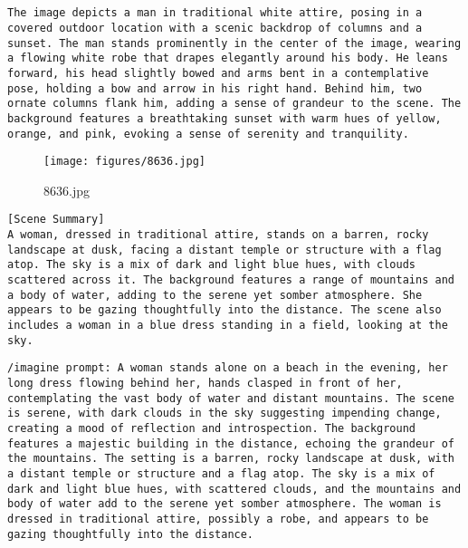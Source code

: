 \begin{lstlisting}[caption={Captions using Llama 3.2 with SAM 2 for 7386.jpg}]


The image depicts a man in traditional white attire, posing in a covered outdoor location with a scenic backdrop of columns and a sunset. The man stands prominently in the center of the image, wearing a flowing white robe that drapes elegantly around his body. He leans forward, his head slightly bowed and arms bent in a contemplative pose, holding a bow and arrow in his right hand. Behind him, two ornate columns flank him, adding a sense of grandeur to the scene. The background features a breathtaking sunset with warm hues of yellow, orange, and pink, evoking a sense of serenity and tranquility.
\end{lstlisting}

\clearpage
\begin{figure}[H]
    \centering
    \texttt{[image: figures/8636.jpg]}
    \caption{8636.jpg}
    \label{fig:8636.jpg}
\end{figure}



\begin{lstlisting}[caption={Captions using Ensemble without Llama for 8636.jpg}]
[Scene Summary]
A woman, dressed in traditional attire, stands on a barren, rocky landscape at dusk, facing a distant temple or structure with a flag atop. The sky is a mix of dark and light blue hues, with clouds scattered across it. The background features a range of mountains and a body of water, adding to the serene yet somber atmosphere. She appears to be gazing thoughtfully into the distance. The scene also includes a woman in a blue dress standing in a field, looking at the sky.
\end{lstlisting}


\begin{lstlisting}[caption={Captions using Ensemble with Llama for 8636.jpg}]
/imagine prompt: A woman stands alone on a beach in the evening, her long dress flowing behind her, hands clasped in front of her, contemplating the vast body of water and distant mountains. The scene is serene, with dark clouds in the sky suggesting impending change, creating a mood of reflection and introspection. The background features a majestic building in the distance, echoing the grandeur of the mountains. The setting is a barren, rocky landscape at dusk, with a distant temple or structure and a flag atop. The sky is a mix of dark and light blue hues, with scattered clouds, and the mountains and body of water add to the serene yet somber atmosphere. The woman is dressed in traditional attire, possibly a robe, and appears to be gazing thoughtfully into the distance.
\end{lstlisting}


